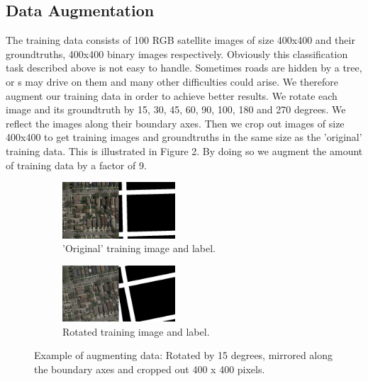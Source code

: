 \documentclass[10pt,conference,compsocconf]{IEEEtran}
\begin{document}
\subsection{Data Augmentation}

The training data consists of 100 RGB satellite images of size 400x400 and their groundtruths, 400x400 binary images respectively. 
Obviously this classification task described above is not easy to handle. Sometimes roads are hidden by a tree, or s may drive on them and many other difficulties could arise. 
We therefore augment our training data in order to achieve better results. We rotate each image and its groundtruth by 15, 30, 45, 60, 90, 100, 180 and 270 degrees. We reflect the images along their boundary axes. Then we crop out images of size 400x400 to get training images and groundtruths in the same size as the 'original' training data. This is illustrated in Figure 2. By doing so we augment the amount of training data by a factor of 9.




\begin{figure}[H]
	\centering
	\begin{subfigure}[htb]{0.2\textwidth}
		\includegraphics[width=4.2cm]{images/data_augment.png}
		\caption{'Original' training image and label.}
		\label{fig:dat}
	\end{subfigure}
	\hspace{1.5em}
	\begin{subfigure}[htb]{0.2\textwidth}
		\includegraphics[width=4.2cm]{images/data_augment_rot.png}
		\caption{Rotated training image and label.}
		\label{fig:datrot}
	\end{subfigure}
	\caption{Example of augmenting data: Rotated by 15 degrees, mirrored along the boundary axes and cropped out 400 x 400 pixels.}
\end{figure}
\end{document}

